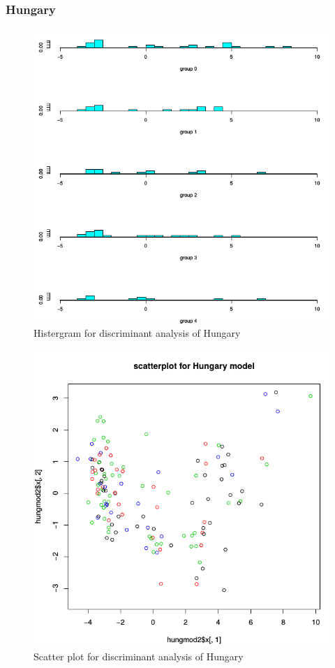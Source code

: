 \documentclass[a4paper]{article}
\begin{document}
\newpage
\subsubsection{Hungary}



\begin{figure}[H]
	\begin{center}
		\includegraphics[width=12cm]{Q4_pics/Hung-Histgram.png}
	\end{center}
	\caption{Histergram for discriminant analysis of Hungary}
	\label{q4_hung_historgram}
\end{figure}

\begin{figure}[H]
	\begin{center}
		\includegraphics[width=12cm]{Q4_pics/Hung-scatter.png}
	\end{center}
	\caption{Scatter plot for discriminant analysis of Hungary}
	\label{q4_hung_scatter}
\end{figure}
\end{document}
